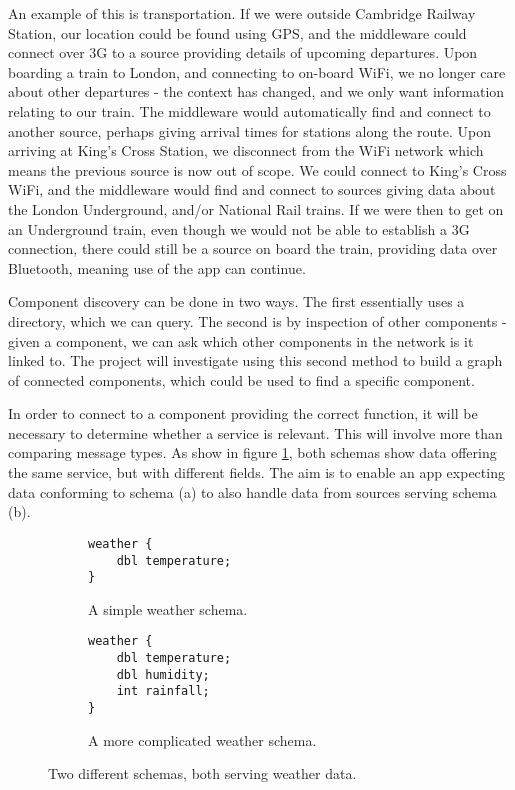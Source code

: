 An example of this is transportation. If we were outside Cambridge Railway Station, our location could be found using GPS, and the middleware could connect over 3G to a source providing details of upcoming departures. Upon boarding a train to London, and connecting to on-board WiFi, we no longer care about other departures - the context has changed, and we only want information relating to our train. The middleware would automatically find and connect to another source, perhaps giving arrival times for stations along the route. Upon arriving at King's Cross Station, we disconnect from the WiFi network which means the previous source is now out of scope. We could connect to King's Cross WiFi, and the middleware would find and connect to sources giving data about the London Underground, and/or National Rail trains. If we were then to get on an Underground train, even though we would not be able to establish a 3G connection, there could still be a source on board the train, providing data over Bluetooth, meaning use of the app can continue.

Component discovery can be done in two ways. The first essentially uses a directory, which we can query. The second is by inspection of other components - given a component, we can ask which other components in the network is it linked to. The project will investigate using this second method to build a graph of connected components, which could be used to find a specific component.

In order to connect to a component providing the correct function, it will be necessary to determine whether a service is relevant. This will involve more than comparing message types. As show in figure \ref{fig:differentSchemas}, both schemas show data offering the same service, but with different fields. The aim is to enable an app expecting data conforming to schema (a) to also handle data from sources serving schema (b).

\begin{figure}[h]
\begin{subfigure}[b]{0.5\textwidth}
\begin{verbatim}
weather {
    dbl temperature;
}
\end{verbatim}
\caption{A simple weather schema.}
\end{subfigure}
\begin{subfigure}[b]{0.5\textwidth}
\begin{verbatim}
weather {
    dbl temperature;
    dbl humidity;
    int rainfall;
}
\end{verbatim}
\caption{A more complicated weather schema.}
\end{subfigure}
\caption{Two different schemas, both serving weather data.}
\label{fig:differentSchemas}
\end{figure}

